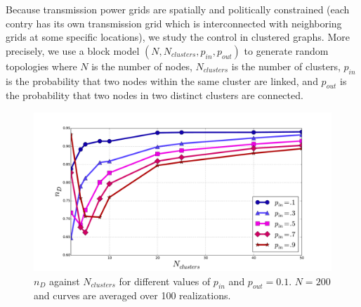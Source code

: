 \documentclass[conference]{IEEEtran}
\begin{document}
Because transmission power grids are spatially and politically constrained (each contry has its own transmission grid which is interconnected with neighboring grids at some specific locations), we study the control in clustered graphs. More precisely, we use a block model $(N, N_{clusters}, p_{in}, p_{out} ) $ to generate random topologies where $ N $ is the number of nodes, $N_{clusters} $ is the number of clusters, $p_{in} $ is the probability that two nodes within the same cluster are linked, and $ p_{out} $ is the probability that two nodes in two distinct clusters are connected.

\begin{figure}
\includegraphics[scale=.25]{./figure_5/figure_5}
\caption{$n_D$ against $N_{clusters} $ for different values of $ p_{in} $ and $ p_{out} = 0.1 $. $ N=200 $ and curves are averaged over 100 realizations.}
\label{fig:block_model_1}
\end{figure}
\end{document}

